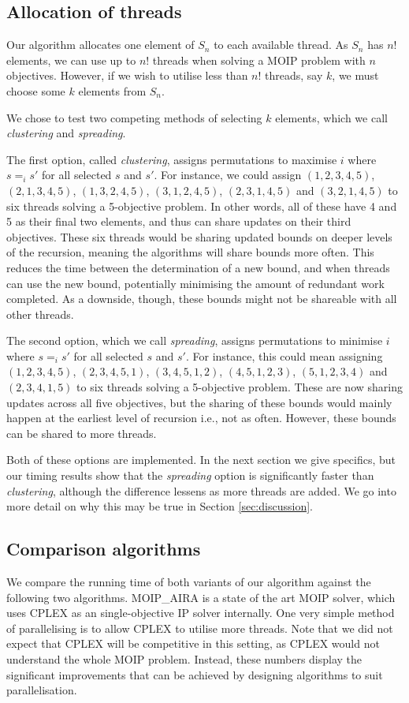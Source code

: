 \documentclass{amsart}
\theoremstyle{definition}
\begin{document}
\subsection{Allocation of threads}\label{sec:allocating-threads}
Our algorithm allocates one element of $S_n$ to each available thread.
As $S_n$ has $n!$ elements, we can use up to $n!$ threads when solving a MOIP problem with $n$ objectives.
However, if we wish to utilise less than $n!$ threads, say $k$, we must choose some $k$ elements from $S_n$.

We chose to test two competing methods of selecting $k$ elements, which we call \emph{clustering} and \emph{spreading}.

The first option, called \emph{clustering}, assigns
permutations to maximise $i$ where $s =_i s'$ for all selected $s$ and $s'$.
For instance, we could assign $(1,2,3,4,5)$, $(2,1,3,4,5)$, $(1,3,2,4,5)$, $(3,1,2,4,5)$, $(2,3,1,4,5)$ and $(3,2,1,4,5)$ to six threads solving a 5-objective problem.
In other words, all of these have 4 and 5 as their final two elements, and thus can share updates on 
their third objectives.
These six threads would be sharing updated bounds on deeper levels of the recursion, meaning the algorithms will share bounds more often.
This reduces the time between the determination of a new bound, and when threads can use the new bound, potentially minimising the amount of redundant work completed.
As a downside, though, these bounds might not be shareable with all other threads.

The second option, which we call \emph{spreading}, assigns permutations to minimise $i$ where $s =_i s'$ for all selected $s$ and $s'$.
For instance, this could mean assigning $(1,2,3,4,5)$, $(2,3,4,5,1)$, $(3,4,5,1,2)$, $(4,5,1,2,3)$, $(5,1,2,3,4)$ and $(2,3,4,1,5)$ to six threads solving a 5-objective problem.
These are now sharing updates across all five objectives, but the sharing of these bounds would mainly happen at the earliest level of recursion i.e., not as often.
However, these bounds can be shared to more threads.

Both of these options are implemented.
In the next section we give specifics, but our timing results show that the \emph{spreading} option is significantly faster than \emph{clustering}, although the difference lessens as more threads are added.
We go into more detail on why this may be true in Section \ref{sec:discussion}.

\subsection{Comparison algorithms}
We compare the running time of both variants of our algorithm against the following two algorithms.
MOIP\_AIRA \cite{Ozlen2014moipaira} is a state of the art MOIP solver, which uses CPLEX \cite{CPLEX} as an single-objective IP solver internally.
One very simple method of parallelising is to allow CPLEX to utilise more threads.
Note that we did not expect that CPLEX will be competitive in this setting, as CPLEX would not understand the whole MOIP problem.
Instead, these numbers display the significant improvements that can be achieved by designing algorithms to suit parallelisation.
\end{document}

